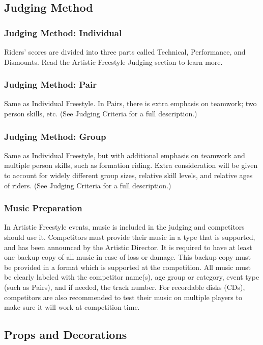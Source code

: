 \subsection{Judging Method}

\subsubsection{Judging Method: Individual}
Riders' scores are divided into three parts called Technical, Performance, and Dismounts.
Read the Artistic Freestyle Judging section to learn more.

\subsubsection{Judging Method: Pair}
Same as Individual Freestyle.
In Pairs, there is extra emphasis on teamwork; two person skills, etc.
(See Judging Criteria for a full description.)

\subsubsection{Judging Method: Group}
Same as Individual Freestyle, but with additional emphasis on teamwork and multiple person skills, such as formation riding.
Extra consideration will be given to account for widely different group sizes, relative skill levels, and relative ages of riders.
(See Judging Criteria for a full description.)

\subsubsection{Music Preparation}
\label{sec:freestyle_music}
In Artistic Freestyle events, music is included in the judging and competitors should use it.
Competitors must provide their music in a type that is supported, and has been announced by the Artistic Director.
It is required to have at least one backup copy of all music in case of loss or damage.
This backup copy must be provided in a format which is supported at the competition.
All music must be clearly labeled with the competitor name(s), age group or category, event type (such as Pairs), and if needed, the track number.
For recordable disks (CDs), competitors are also recommended to test their music on multiple players to make sure it will work at competition time.

\subsection{Props and Decorations \label{subsec:freestyle_freestyle-rules_individual-freestyle-overview_props-and-decorations}}

